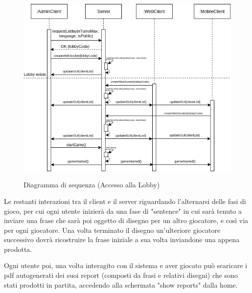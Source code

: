 \begin{figure}[H]
    \caption{Diagramma di sequenza (Accesso alla Lobby)}
    \centering
    \includegraphics[width=150mm]{img/ingSoft/Sequence Lobby.png}
    \label{fig:sequence_lobby}
\end{figure}


\noindent Le restanti interazioni tra il client e il server riguardando l'alternarsi delle fasi di gioco, per cui ogni utente inizierà da una fase di "sentence" in cui sarà tenuto a inviare una frase che sarà poi oggetto di disegno per un altro giocatore, e così via per ogni giocatore. Una volta terminato il disegno un'ulteriore giocatore successivo dovrà ricostruire la frase iniziale a sua volta inviandone una appena prodotta. \newline

\noindent Ogni utente poi, una volta interagito con il sistema e aver giocato può scaricare i pdf autogenerati dei suoi report (composti da frasi e relativi disegni) che sono stati prodotti in partita, accedendo alla schermata "show reports" dalla home.

